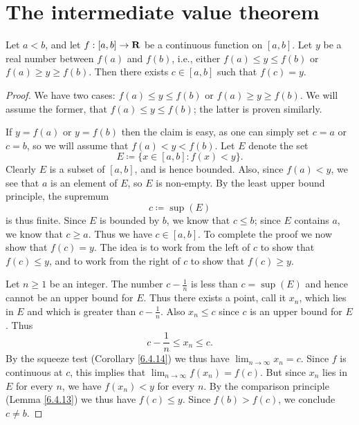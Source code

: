 \section{The intermediate value theorem}\label{sec 9.7}

\begin{theorem}\label{9.7.1}
    Let \(a < b\), and let \(f : [a, b] \to \mathbf{R}\) be a continuous function on \([a, b]\).
    Let \(y\) be a real number between \(f(a)\) and \(f(b)\), i.e., either \(f(a) \leq y \leq f(b)\) or \(f(a) \geq y \geq f(b)\).
    Then there exists \(c \in [a, b]\) such that \(f(c) = y\).
\end{theorem}

\begin{proof}
    We have two cases: \(f(a) \leq y \leq f(b)\) or \(f(a) \geq y \geq f(b)\).
    We will assume the former, that \(f(a) \leq y \leq f(b)\);
    the latter is proven similarly.

    If \(y = f(a)\) or \(y = f(b)\) then the claim is easy, as one can simply set \(c = a\) or \(c = b\), so we will assume that \(f(a) < y < f(b)\).
    Let \(E\) denote the set
    \[
        E \coloneqq \{x \in [a, b] : f(x) < y\}.
    \]
    Clearly \(E\) is a subset of \([a, b]\), and is hence bounded.
    Also, since \(f(a) < y\), we see that \(a\) is an element of \(E\), so \(E\) is non-empty.
    By the least upper bound principle, the supremum
    \[
        c \coloneqq \sup(E)
    \]
    is thus finite.
    Since \(E\) is bounded by \(b\), we know that \(c \leq b\);
    since \(E\) contains \(a\), we know that \(c \geq a\).
    Thus we have \(c \in [a, b]\).
    To complete the proof we now show that \(f(c) = y\).
    The idea is to work from the left of \(c\) to show that \(f(c) \leq y\), and to work from the right of \(c\) to show that \(f(c) \geq y\).

    Let \(n \geq 1\) be an integer.
    The number \(c - \frac{1}{n}\) is less than \(c = \sup(E)\) and hence cannot be an upper bound for \(E\).
    Thus there exists a point, call it \(x_n\), which lies in \(E\) and which is greater than \(c - \frac{1}{n}\).
    Also \(x_n \leq c\) since \(c\) is an upper bound for \(E\).
    Thus
    \[
        c - \frac{1}{n} \leq x_n \leq c.
    \]
    By the squeeze test (Corollary \ref{6.4.14}) we thus have \(\lim_{n \to \infty} x_n = c\).
    Since \(f\) is continuous at \(c\), this implies that \(\lim_{n \to \infty} f(x_n) = f(c)\).
    But since \(x_n\) lies in \(E\) for every \(n\), we have \(f(x_n) < y\) for every \(n\).
    By the comparison principle (Lemma \ref{6.4.13}) we thus have \(f(c) \leq y\).
    Since \(f(b) > f(c)\), we conclude \(c \neq b\).


\end{proof}
